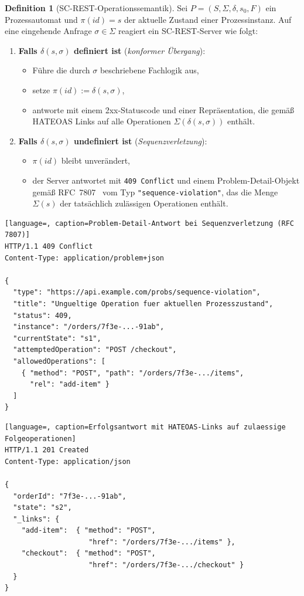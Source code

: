 ﻿\documentclass[a4paper,12pt]{article}
\theoremstyle{definition}
\newtheorem{definition}{Definition}
\begin{document}
\begin{definition}[SC-REST-Operationssemantik]
	\label{def:sc-rest-server}
	Sei $P = (S,\Sigma,\delta,s_0,F)$ ein Prozessautomat und $\pi(id) = s$ der aktuelle
	Zustand einer Prozessinstanz. Auf eine eingehende Anfrage $\sigma \in \Sigma$
	reagiert ein SC-REST-Server wie folgt:
	\begin{enumerate}
		\item \textbf{Falls $\delta(s,\sigma)$ definiert ist} (\emph{konformer Übergang}):
		\begin{itemize}
			\item Führe die durch $\sigma$ beschriebene Fachlogik aus,
			\item setze $\pi(id) := \delta(s,\sigma)$,
			\item antworte mit einem 2xx-Statuscode und einer Repräsentation, die
			      gemäß HATEOAS Links auf alle Operationen
			      $\Sigma(\delta(s,\sigma))$ enthält.
		\end{itemize}
		\item \textbf{Falls $\delta(s,\sigma)$ undefiniert ist} (\emph{Sequenzverletzung}):
		\begin{itemize}
			\item $\pi(id)$ bleibt unverändert,
			\item der Server antwortet mit \texttt{409 Conflict} und einem
			      Problem-Detail-Objekt gemäß RFC~7807~\cite{rfc7807} vom Typ
			      \texttt{"{}sequence-violation"{}}, das die Menge $\Sigma(s)$ der
			      tatsächlich zulässigen Operationen enthält.
		\end{itemize}
	\end{enumerate}
\end{definition}

\begin{lstlisting}[language=, caption=Problem-Detail-Antwort bei Sequenzverletzung (RFC 7807)]
HTTP/1.1 409 Conflict
Content-Type: application/problem+json

{
  "type": "https://api.example.com/probs/sequence-violation",
  "title": "Ungueltige Operation fuer aktuellen Prozesszustand",
  "status": 409,
  "instance": "/orders/7f3e-...-91ab",
  "currentState": "s1",
  "attemptedOperation": "POST /checkout",
  "allowedOperations": [
    { "method": "POST", "path": "/orders/7f3e-.../items",
      "rel": "add-item" }
  ]
}
\end{lstlisting}

\begin{lstlisting}[language=, caption=Erfolgsantwort mit HATEOAS-Links auf zulaessige Folgeoperationen]
HTTP/1.1 201 Created
Content-Type: application/json

{
  "orderId": "7f3e-...-91ab",
  "state": "s2",
  "_links": {
    "add-item":  { "method": "POST",
                    "href": "/orders/7f3e-.../items" },
    "checkout":  { "method": "POST",
                    "href": "/orders/7f3e-.../checkout" }
  }
}
\end{lstlisting}
\end{document}
